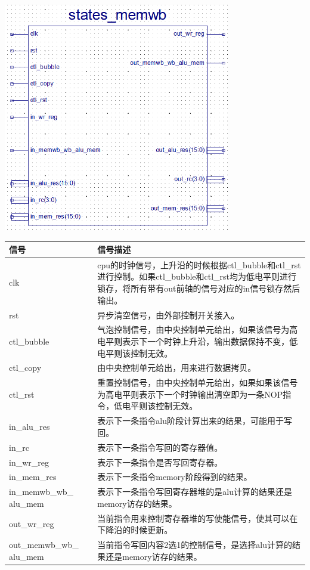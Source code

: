 \begin{center}
    \includegraphics[height=10cm]{image/detail/detail_memwb.png}
    \label{fig:memwb}
\end{center}

\begin{center}
    \label{table:memwb}
    \begin{longtable}{p{}p{}}
        \toprule
        信号 & 信号描述 \\
        \midrule
        clk & cpu的时钟信号，上升沿的时候根据ctl\_bubble和ctl\_rst进行控制。如果ctl\_bubble和ctl\_rst均为低电平则进行锁存，将所有带有out前轴的信号对应的in信号锁存然后输出。\\
        rst & 异步清空信号，由外部控制开关接入。\\
        ctl\_bubble &  气泡控制信号，由中央控制单元给出，如果该信号为高电平则表示下一个时钟上升沿，输出数据保持不变，低电平则该控制无效。\\
        ctl\_copy &  由中央控制单元给出，用来进行数据拷贝。\\
        ctl\_rst &  重置控制信号，由中央控制单元给出，如果如果该信号为高电平则表示下一个时钟输出清空即为一条NOP指令，低电平则该控制无效。\\
        in\_alu\_res & 表示下一条指令alu阶段计算出来的结果，可能用于写回。\\
        in\_rc & 表示下一条指令写回的寄存器值。\\
        in\_wr\_reg & 表示下一条指令是否写回寄存器。\\
        in\_mem\_res & 表示下一条指令memory阶段得到的结果。\\
        in\_memwb\_wb\_ alu\_mem & 表示下一条指令写回寄存器堆的是alu计算的结果还是memory访存的结果。\\
        out\_wr\_reg & 当前指令用来控制寄存器堆的写使能信号，使其可以在下降沿的时候更新。\\
        out\_memwb\_wb\_ alu\_mem & 当前指令写回内容2选1的控制信号，是选择alu计算的结果还是memory访存的结果。\\
        \bottomrule
    \end{longtable}
\end{center}


